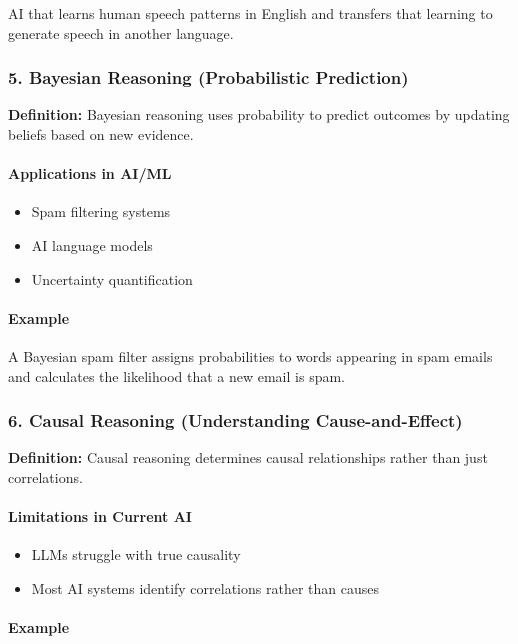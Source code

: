 AI that learns human speech patterns in English and transfers that learning to generate speech in another language.

\subsubsection{5. Bayesian Reasoning (Probabilistic Prediction)}

\textbf{Definition:} Bayesian reasoning uses probability to predict outcomes by updating beliefs based on new evidence.

\paragraph{Applications in AI/ML}

\begin{itemize}
\item Spam filtering systems
\item AI language models
\item Uncertainty quantification
\end{itemize}

\paragraph{Example}

A Bayesian spam filter assigns probabilities to words appearing in spam emails and calculates the likelihood that a new email is spam.

\subsubsection{6. Causal Reasoning (Understanding Cause-and-Effect)}

\textbf{Definition:} Causal reasoning determines causal relationships rather than just correlations.

\paragraph{Limitations in Current AI}

\begin{itemize}
\item LLMs struggle with true causality
\item Most AI systems identify correlations rather than causes
\end{itemize}

\paragraph{Example}

